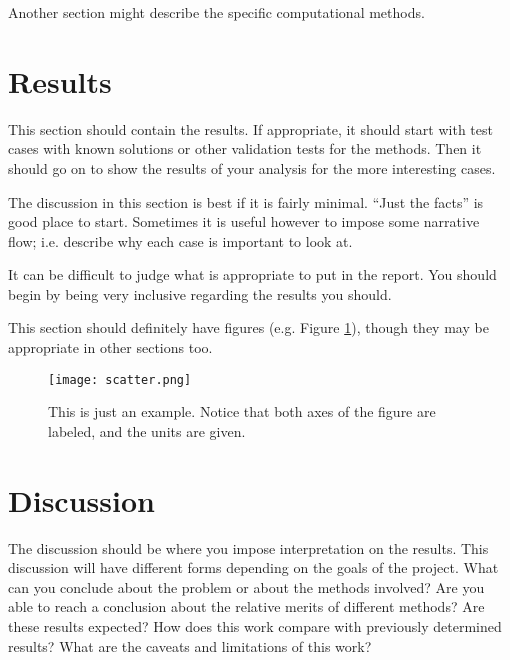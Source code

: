 \documentclass[11pt]{article}
\begin{document}
Another section might describe the specific computational methods.

\section{Results}
\label{sec:results}

This section should contain the results. If appropriate, it should
start with test cases with known solutions or other validation tests
for the methods. Then it should go on to show the results of your
analysis for the more interesting cases.

The discussion in this section is best if it is fairly minimal. ``Just
the facts'' is good place to start. Sometimes it is useful however to
impose some narrative flow; i.e. describe why each case is important
to look at.

It can be difficult to judge what is appropriate to put in the
report. You should begin by being very inclusive regarding the results
you should.

This section should definitely have figures (e.g. Figure
\ref{fig:example}), though they may be appropriate in other sections
too.

\begin{figure}[b!]
\centering
\texttt{[image: scatter.png]}
\caption{ \label{fig:example} This is just an example. Notice that
  both axes of the figure are labeled, and the units are given.}
\end{figure}
  
\section{Discussion}

The discussion should be where you impose interpretation on the
results. This discussion will have different forms depending on the
goals of the project. What can you conclude about the problem or about
the methods involved? Are you able to reach a conclusion about the
relative merits of different methods? Are these results expected? How
does this work compare with previously determined results? What are
the caveats and limitations of this work?



\end{document}
